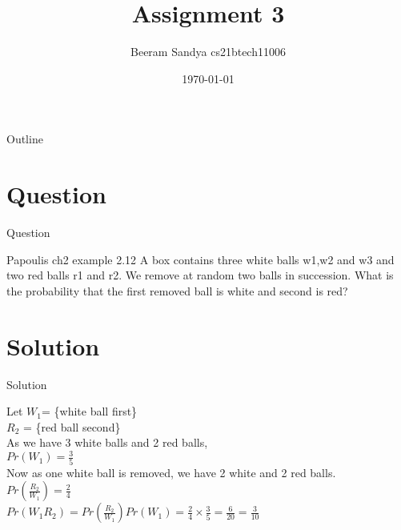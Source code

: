 \documentclass{beamer}
\title{Assignment 3}
\author{Beeram Sandya cs21btech11006}
\date{\today}
\begin{document}
\begin{frame}
    \titlepage 
\end{frame}

\logo{}


\begin{frame}{Outline}
    \tableofcontents
\end{frame}


\section{Question}
\begin{frame}{Question}
\begin{block}{Papoulis ch2 example 2.12}
A box contains three white balls w1,w2 and w3 and two red balls r1 and r2. We remove at random two balls in succession. What is the probability that the first removed ball is white and second is red?
\end{block}
\end{frame}


\section{Solution}
\begin{frame}{Solution}
    
Let $ W_1 $= \{white ball first\}\\
   $ R_2$ = \{red ball second\}\\
    As we have 3 white balls and 2 red balls,\\
    $Pr\left(W_1\right) = \frac{3}{5}$\\
    Now as one white ball is removed, we have 2 white and 2 red balls.\\
    $Pr\left(\frac{R_2}{W_1}\right) = \frac{2}{4}$\\
    $Pr\left(W_1R_2\right)=Pr\left(\frac{R_2}{W_1}\right){Pr\left(W_1\right)}=\frac{2}{4}\times\frac{3}{5}=\frac{6}{20}=\frac{3}{10}$

    
\end{frame} 
\end{document}
